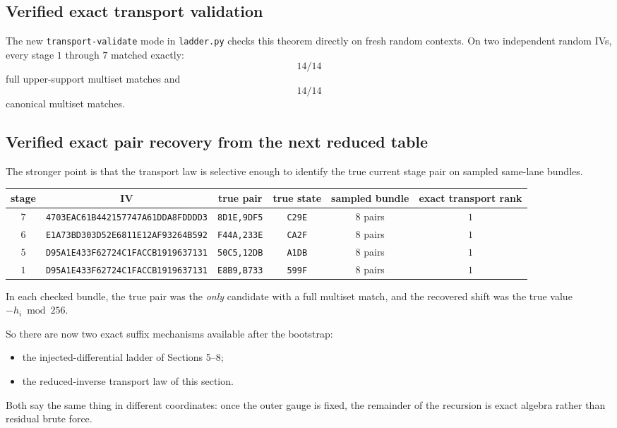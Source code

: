 \documentclass[11pt]{article}
\begin{document}
\subsection*{Verified exact transport validation}
The new \texttt{transport-validate} mode in \texttt{ladder.py} checks this theorem directly on fresh random contexts. On two independent random IVs, every stage $1$ through $7$ matched exactly:
\[
14/14
\]
full upper-support multiset matches and
\[
14/14
\]
canonical multiset matches.

\subsection*{Verified exact pair recovery from the next reduced table}
The stronger point is that the transport law is selective enough to identify the true current stage pair on sampled same-lane bundles.

\begin{center}
\begin{tabular}{cccccc}
\toprule
stage & IV & true pair & true state & sampled bundle & exact transport rank \\
\midrule
$7$ & \texttt{4703EAC61B442157747A61DDA8FDDDD3} & \texttt{8D1E,9DF5} & \texttt{C29E} & $8$ pairs & $1$ \\
$6$ & \texttt{E1A73BD303D52E6811E12AF93264B592} & \texttt{F44A,233E} & \texttt{CA2F} & $8$ pairs & $1$ \\
$5$ & \texttt{D95A1E433F62724C1FACCB1919637131} & \texttt{50C5,12DB} & \texttt{A1DB} & $8$ pairs & $1$ \\
$1$ & \texttt{D95A1E433F62724C1FACCB1919637131} & \texttt{E8B9,B733} & \texttt{599F} & $8$ pairs & $1$ \\
\bottomrule
\end{tabular}
\end{center}

In each checked bundle, the true pair was the \emph{only} candidate with a full multiset match, and the recovered shift was the true value $-h_i \bmod 256$.

So there are now two exact suffix mechanisms available after the bootstrap:
\begin{itemize}
\item the injected-differential ladder of Sections 5--8;
\item the reduced-inverse transport law of this section.
\end{itemize}
Both say the same thing in different coordinates: once the outer gauge is fixed, the remainder of the recursion is exact algebra rather than residual brute force.
\end{document}
